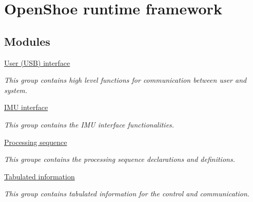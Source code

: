\hypertarget{group__openshoe__software}{
\section{\-Open\-Shoe runtime framework}
\label{group__openshoe__software}
}
\subsection*{\-Modules}
\begin{DoxyCompactItemize}
\item 
\hyperlink{group__user__interface}{\-User (\-U\-S\-B) interface}
\begin{DoxyCompactList}\small\item\em \-This group contains high level functions for communication between user and system. \end{DoxyCompactList}\item 
\hyperlink{group__imu__interface}{\-I\-M\-U interface}
\begin{DoxyCompactList}\small\item\em \-This group contains the \-I\-M\-U interface functionalities. \end{DoxyCompactList}\item 
\hyperlink{group__proc__sequence}{\-Processing sequence}
\begin{DoxyCompactList}\small\item\em \-This groupe contains the processing sequence declarations and definitions. \end{DoxyCompactList}\item 
\hyperlink{group__control__tables}{\-Tabulated information}
\begin{DoxyCompactList}\small\item\em \-This group contains tabulated information for the control and communication. \end{DoxyCompactList}\end{DoxyCompactItemize}
